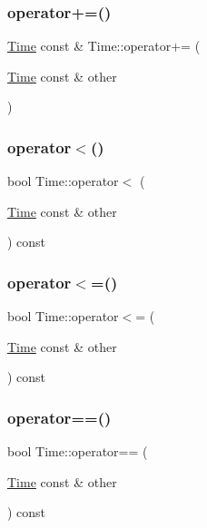 \mbox{\label{classTime_a54a1d73b40abf9578a5d324d2805fdce}} 
\subsubsection{\texorpdfstring{operator+=()}{operator+=()}}
{\footnotesize\ttfamily \hyperlink{classTime}{Time} const  \& Time\+::operator+= (\begin{DoxyParamCaption}\item[{\hyperlink{classTime}{Time} const \&}]{other }\end{DoxyParamCaption})}

\mbox{\label{classTime_a334738a8a0f1f8d1e6ec15d0128ad5d3}} 
\subsubsection{\texorpdfstring{operator$<$()}{operator<()}}
{\footnotesize\ttfamily bool Time\+::operator$<$ (\begin{DoxyParamCaption}\item[{\hyperlink{classTime}{Time} const \&}]{other }\end{DoxyParamCaption}) const}

\mbox{\label{classTime_a31ca86633797092eb6f997e17dd1a267}} 
\subsubsection{\texorpdfstring{operator$<$=()}{operator<=()}}
{\footnotesize\ttfamily bool Time\+::operator$<$= (\begin{DoxyParamCaption}\item[{\hyperlink{classTime}{Time} const \&}]{other }\end{DoxyParamCaption}) const}

\mbox{\label{classTime_a682cdf808ba44f29b2e33ed257906a10}} 
\subsubsection{\texorpdfstring{operator==()}{operator==()}}
{\footnotesize\ttfamily bool Time\+::operator== (\begin{DoxyParamCaption}\item[{\hyperlink{classTime}{Time} const \&}]{other }\end{DoxyParamCaption}) const}

